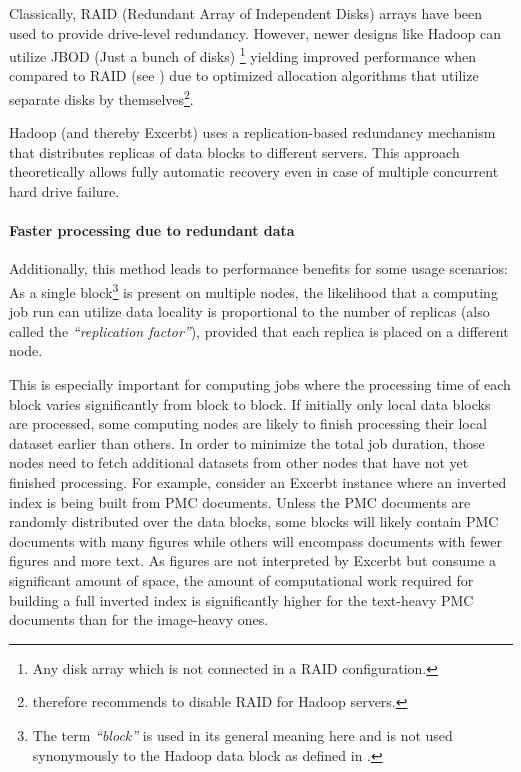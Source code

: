 \documentclass[a4paper, 12pt, twoside, reqn]{report}
\numberwithin{figure}{chapter}
\newtheorem[L]{boxedDefinition}{Definition}
\newtheorem[L]{boxedExample}{Example}
\newcommand{\itquote}[1]{\textit{{``}#1{''}}}
\begin{document}
Classically, RAID (Redundant Array of Independent Disks) arrays have been used to provide drive-level redundancy. However, newer designs like Hadoop can utilize JBOD (Just a bunch of disks) \footnote{Any disk array which is not connected in a RAID configuration.} yielding improved performance when compared to RAID (see \cite[chapter 9]{white2009hadoop}) due to optimized allocation algorithms that utilize separate disks by themselves\footnote{\cite{white2009hadoop} therefore recommends to disable RAID for Hadoop servers.}.

Hadoop (and thereby Excerbt) uses a replication-based redundancy mechanism that distributes replicas of data blocks to different servers. This approach theoretically allows fully automatic recovery even in case of multiple concurrent hard drive failure.

\paragraph{Faster processing due to redundant data}

Additionally, this method leads to performance benefits for some usage scenarios: As a single block\footnote{The term \itquote{block} is used in its general meaning here and is not used synonymously to the Hadoop data block as defined in \cite{white2009hadoop}.} is present on multiple nodes, the likelihood that a computing job run can utilize data locality is proportional to the number of replicas (also called the \itquote{replication factor}), provided that each replica is placed on a different node.

This is especially important for computing jobs where the processing time of each block varies significantly from block to block. If initially only local data blocks are processed, some computing nodes are likely to finish processing their local dataset earlier than others. In order to minimize the total job duration, those nodes need to fetch additional datasets from other nodes that have not yet finished processing.
For example, consider an Excerbt instance where an inverted index is being built from PMC documents. Unless the PMC documents are randomly distributed over the data blocks, some blocks will likely contain PMC documents with many figures while others will encompass documents with fewer figures and more text. As figures are not interpreted by Excerbt but consume a significant amount of space, the amount of computational work required for building a full inverted index is significantly higher for the text-heavy PMC documents than for the image-heavy ones.
\end{document}
